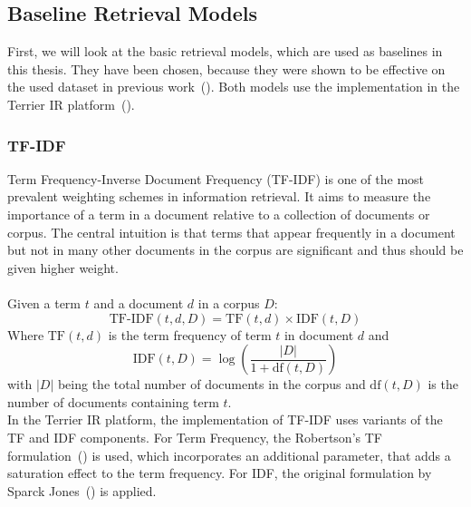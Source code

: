 \subsection{Baseline Retrieval Models}\label{sec:baseline-retrieval-models}
First, we will look at the basic retrieval models, which are used as baselines in this thesis.
They have been chosen, because they were shown to be effective on the used dataset in previous work~(\cite{goeuriot:2021}).
Both models use the implementation in the Terrier IR platform~(\cite{ounis:2005}).

\subsubsection{TF-IDF}\label{sec:tf-idf}
Term Frequency-Inverse Document Frequency (TF-IDF) is one of the most prevalent weighting schemes in information retrieval.
It aims to measure the importance of a term in a document relative to a collection of documents or corpus.
The central intuition is that terms that appear frequently in a document but not in many other documents in the corpus are significant and thus should be given higher weight.
\\\\
Given a term \( t \) and a document \( d \) in a corpus \( D \):
\[ \text{TF-IDF}(t, d, D) = \text{TF}(t, d) \times \text{IDF}(t, D) \]
Where \( \text{TF}(t, d) \) is the term frequency of term \( t \) in document \( d \) and 
\[ \text{IDF}(t, D) = \log \left( \frac{|D|}{1 + \text{df}(t, D)} \right) \]
with \( |D| \) being the total number of documents in the corpus and \( \text{df}(t, D) \) is the number of documents containing term \( t \).
\\
In the Terrier IR platform, the implementation of TF-IDF uses variants of the TF and IDF components.
For Term Frequency, the Robertson's TF formulation~(\cite{robertson:2004}) is used, which incorporates an additional parameter, that adds a saturation effect to the term frequency.
For IDF, the original formulation by Sparck Jones~(\cite{sparck:1972}) is applied.

